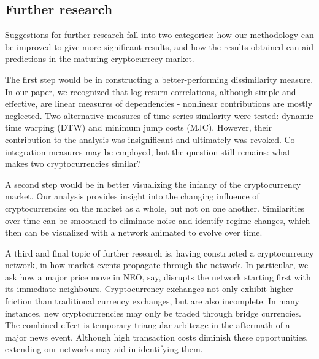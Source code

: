 \documentclass[a4paper]{article}
\begin{document}
\begin{multicols}{2}

\section{Further research}\label{further}

Suggestions for further research fall into two categories: how our methodology can be improved to give more significant results, and how the results obtained can aid predictions in the maturing cryptocurrecy market. 

The first step would be in constructing a better-performing dissimilarity measure. In our paper, we recognized that log-return correlations, although simple and effective, are linear measures of dependencies - nonlinear contributions are mostly neglected. Two alternative measures of time-series similarity were tested: dynamic time warping (DTW) and minimum jump costs (MJC). However, their contribution to the analysis was insignificant and ultimately was revoked. Co-integration measures may be employed, but the question still remains: what makes two cryptocurrencies similar? 

A second step would be in better visualizing the infancy of the cryptocurrency market. Our analysis provides insight into the changing influence of cryptocurrencies on the market as a whole, but not on one another. Similarities over time can be smoothed to eliminate noise and identify regime changes, which then can be visualized with a network animated to evolve over time. 

A third and final topic of further research is, having constructed a cryptocurrency network, in how market events propagate through the network. In particular, we ask how a major price move in NEO, say, disrupts the network starting first with its immediate neighbours. Cryptocurrency exchanges not only exhibit higher friction than traditional currency exchanges, but are also incomplete. In many instances, new cryptocurrencies may only be traded through bridge currencies. The combined effect is temporary triangular arbitrage in the aftermath of a major news event. Although high transaction costs diminish these opportunities, extending our networks may aid in identifying them.
\end{multicols}
\newpage
\renewcommand{\refname}{References} 
\end{document}
